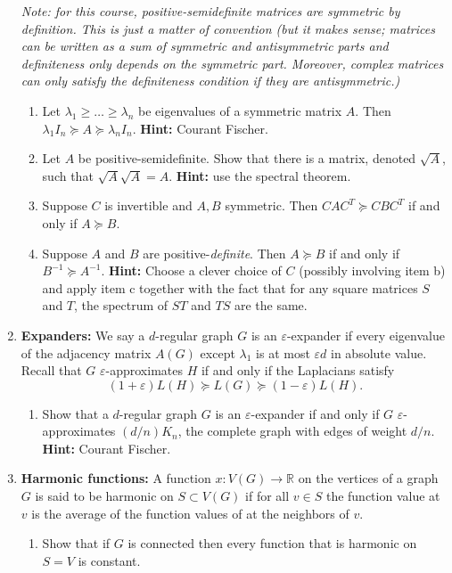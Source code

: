 \documentclass[11pt, oneside]{article}   	%
\newcommand{\RR}{\mathbb R}
\theoremstyle{definition}
\begin{document}
\begin{enumerate}
 \emph{Note: for this course, positive-semidefinite matrices are symmetric by definition. This is just a matter of convention (but it makes sense; matrices can be written as a sum of symmetric and antisymmetric parts and definiteness only depends on the symmetric part. Moreover, complex matrices can only satisfy the definiteness condition if they are antisymmetric.)}
\begin{enumerate}
\item Let $\lambda_1\geq  \dots\geq  \lambda_n$ be eigenvalues of a symmetric matrix $A$. Then $\lambda_1 I_n \succeq A \succeq \lambda_n I_n$. \textbf{Hint: } Courant Fischer.
\item Let $A$ be positive-semidefinite. Show that there is a matrix, denoted $\sqrt{A}$, such that $\sqrt{A}\sqrt{A} = A$. \textbf{Hint:} use the spectral theorem.
\item Suppose $C$ is invertible and $A, B$ symmetric. Then $C A C^T \succeq C B C^T$ if and only if $A \succeq B$.
\item Suppose $A$ and $B$ are positive-\emph{definite}. Then $A \succeq B$ if and only if $B^{-1} \succeq A^{-1}$. \textbf{Hint:} Choose a clever choice of $C$ (possibly involving item b) and apply item c together with the fact that for any square matrices $S$ and $T$, the spectrum of $ST$ and $TS$ are the same.
\end{enumerate}
\item \textbf{Expanders:}
We say a $d$-regular graph $G$ is an $\varepsilon$-expander if every eigenvalue of the adjacency matrix $A(G)$ except $\lambda_1$ is at most $\varepsilon d$ in absolute value. Recall that $G$ $\varepsilon$-approximates $H$ if and only if the Laplacians satisfy
$$ (1 + \varepsilon) L(H) \succeq L(G) \succeq (1 - \varepsilon) L(H).$$
\begin{enumerate}
\item 
Show that a $d$-regular graph $G$ is an $\varepsilon$-expander if and only if $G$ $\varepsilon$-approximates $(d/n) K_n$, the complete graph with edges of weight $d/n$. \textbf{Hint: } Courant Fischer.
\end{enumerate}
\item \textbf{Harmonic functions:} A function $x:V(G) \to \RR$ on the vertices of a graph $G$ is said to be harmonic on $S \subset V(G)$ if for all $v \in S$ the function value at $v$ is the average of the function values of at the neighbors of $v$. 
\begin{enumerate}
\item Show that if $G$ is connected then every function that is harmonic on $S = V$ is constant. 

\end{enumerate}
\end{enumerate}
\end{document}
